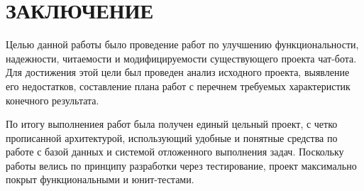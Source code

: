\section*{ЗАКЛЮЧЕНИЕ}
Целью данной работы было проведение работ по улучшению
функциональности, надежности, читаемости и модифицируемости существующего проекта
чат-бота. Для достижения этой цели был проведен анализ исходного проекта, выявление
его недостатков, составление плана работ с перечнем требуемых характеристик конечного
результата.

По итогу выполнениея работ была получен единый цельный проект, с четко прописанной архитектурой,
использующий удобные и понятные средства по работе с базой данных и
системой отложенного выполнения задач.
Поскольку работы велись по принципу разработки через тестирование, проект максимально покрыт
функциональными и юнит-тестами.
